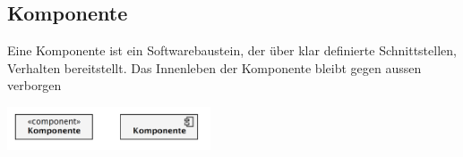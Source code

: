 \subsection{Komponente }
  \begin{minipage}{12cm}
    Eine Komponente ist ein Softwarebaustein, der über klar definierte Schnittstellen, Verhalten bereitstellt.
    Das Innenleben der Komponente bleibt gegen aussen verborgen
  \end{minipage}
  \begin{minipage}{6cm}
    \includegraphics[width=6cm]{./bilder/Komponente.png}
  \end{minipage}
  


